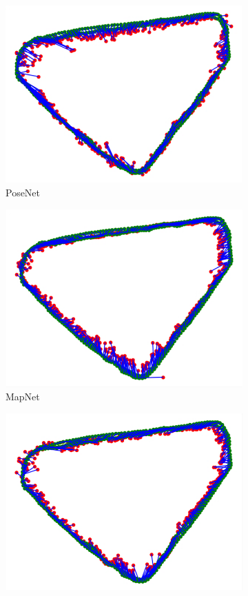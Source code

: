 \documentclass[10pt,twocolumn,letterpaper]{article}
\begin{document}
\begin{figure}[t]
	\begin{center}
		\begin{subfigure}{.23\textwidth}
		\begin{center}
			\includegraphics[width=0.8\linewidth]{images/posenet.png}
			\caption{PoseNet}
		\end{center}
	\end{subfigure}
	\begin{subfigure}{.23\textwidth}
		\begin{center}
			\includegraphics[width=0.8\linewidth]{images/mapnet.png}
			\caption{MapNet}
		\end{center}
	\end{subfigure}
\begin{subfigure}{.23\textwidth}
\begin{center}
	\includegraphics[width=0.8\linewidth]{images/dualinput.png}

\end{center}
\end{subfigure}
\end{center}
\end{figure}
\end{document}
